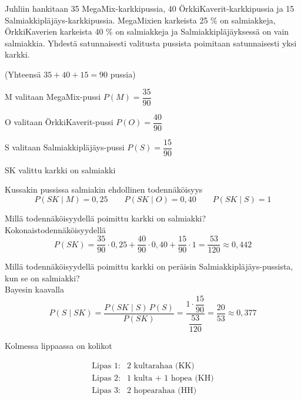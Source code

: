 \documentclass[12pt,a4paper]{article}
\begin{document}
\newpage
{}
Juhliin hankitaan 35 MegaMix-karkkipussia, 
40 ÖrkkiKaverit-karkkipussia ja 
15 Salmiakkipläjäys-karkkipussia. 
MegaMixien karkeista 25 \% on salmiakkeja, 
ÖrkkiKaverien karkeista 40 \% on salmiakkeja ja 
Salmiakkipläjäyksessä on vain salmiakkia. 
Yhdestä satunnaisesti valitusta pussista poimitaan 
satunnaisesti yksi karkki.
\vspace{0.4cm}

(Yhteensä $35+40+15 = 90$ pussia)


\begin{kuvaus}
  \item[M] valitaan MegaMix-pussi \Rightarrow   $P(M)=\dfrac{35}{90}$
  \item[O] valitaan ÖrkkiKaverit-pussi \Rightarrow  $P(O)=\dfrac{40}{90}$
  \item[S] valitaan Salmiakkipläjäys-pussi \Rightarrow  $P(S)=\dfrac{15}{90}$
  \item[SK] valittu karkki on salmiakki
\end{kuvaus}

Kussakin pussissa salmiakin ehdollinen todennäköisyys
\[
P(SK\mid M)=0{,}25\qquad
P(SK\mid O)=0{,}40\qquad
P(SK\mid S)=1
\]

\begin{kohta}
  \item Millä todennäköisyydellä poimittu karkki on salmiakki?\\[12pt]
  Kokonaistodennäköisyydellä
  \[
    P(SK)=\!
      \frac{35}{90}\cdot 0{,}25
    + \frac{40}{90}\cdot 0{,}40
    + \frac{15}{90}\cdot 1
    =\frac{53}{120}\approx 0{,}442
  \]

  \item Millä todennäköisyydellä poimittu karkki on peräisin Salmiakkipläjäys-pussista, kun se on salmiakki?\\[12pt]
  Bayesin kaavalla
  \[
    P(S\mid SK)
    =\frac{P(SK\mid S)\,P(S)}{P(SK)}
    =\frac{1\cdot\dfrac{15}{90}}{\dfrac{53}{120}}
    =\frac{20}{53}\approx 0{,}377
  \]
\end{kohta}









\pagebreak
{}
Kolmessa lippaassa on kolikot

\[
\begin{array}{ll}
\text{Lipas 1:}& \text{2 kultarahaa (KK)}\\
\text{Lipas 2:}& \text{1 kulta + 1 hopea (KH)}\\
\text{Lipas 3:}& \text{2 hopearahaa (HH)}
\end{array}
\]
\end{document}
